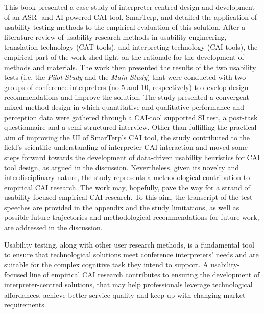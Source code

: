 This book presented a case study of interpreter-centred design and development of an ASR- and AI-powered CAI tool, SmarTerp, and detailed the application of usability testing methods to the empirical evaluation of this solution. After a literature review of usability research methods in usability engineering, translation technology (CAT tools), and interpreting technology (CAI tools), the empirical part of the work shed light on the rationale for the development of methods and materials. The work then presented the results of the two usability tests (i.e. the \textit{Pilot Study} and the \textit{Main Study}) that were conducted with two groups of conference interpreters (no 5 and 10, respectively) to develop design recommendations and improve the solution. The study presented a convergent mixed-method design in which quantitative and qualitative performance and perception data were gathered through a CAI-tool supported SI test, a post-task questionnaire and a semi-structured interview. Other than fulfilling the practical aim of improving the UI of SmarTerp’s CAI tool, the study contributed to the field’s scientific understanding of interpreter-CAI interaction and moved some steps forward towards the development of data-driven usability heuristics for CAI tool design, as argued in the discussion. Nevertheless, given its novelty and interdisciplinary nature, the study represents a methodological contribution to empirical CAI research. The work may, hopefully, pave the way for a strand of usability-focused empirical CAI research. To this aim, the transcript of the test speeches are provided in the appendix and the study limitations, as well as possible future trajectories and methodological recommendations for future work, are addressed in the discussion.

Usability testing, along with other user research methods, is a fundamental tool to ensure that technological solutions meet conference interpreters’ needs and are suitable for the complex cognitive task they intend to support. A usability-focused line of empirical CAI research contributes to ensuring the development of interpreter-centred solutions, that may help professionals leverage technological affordances, achieve better service quality and keep up with changing market requirements.

